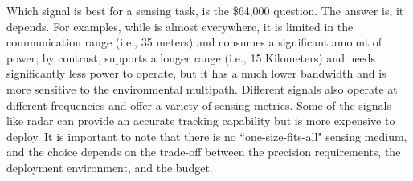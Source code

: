 Which signal is best for a sensing task, is the \$64,000 question. The answer is, it depends. For examples, while \WiFi is almost
everywhere, it is limited in the communication range (i.e., 35 meters) and consumes a significant amount of power; by contrast, \LoRa
supports a longer range (i.e., 15 Kilometers) and needs significantly less power to operate, but it has a much lower bandwidth and is more
sensitive to the environmental multipath. Different signals also operate at different frequencies and offer a variety of sensing metrics.
Some of the signals like \FMCW radar can provide an accurate tracking capability but is more expensive to deploy. It is important to note
that there is no ``one-size-fits-all" sensing medium, and the choice depends on the trade-off between the precision requirements, the
deployment environment, and the budget.
